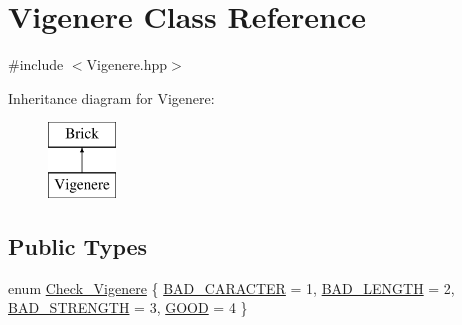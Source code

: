 \hypertarget{class_vigenere}{}\section{Vigenere Class Reference}
\label{class_vigenere}


{\ttfamily \#include $<$Vigenere.\+hpp$>$}

Inheritance diagram for Vigenere\+:\begin{figure}[H]
\begin{center}
\leavevmode
\includegraphics[height=2.000000cm]{d2/dcd/class_vigenere}
\end{center}
\end{figure}
\subsection*{Public Types}
\begin{DoxyCompactItemize}
\item 
enum \hyperlink{class_vigenere_a7c9057eacefc2b70c2f6376808ae24cd}{Check\+\_\+\+Vigenere} \{ \hyperlink{class_vigenere_a7c9057eacefc2b70c2f6376808ae24cda5b266a9ef8e022122a6361ed7b1156d3}{B\+A\+D\+\_\+\+C\+A\+R\+A\+C\+T\+E\+R} = 1, 
\hyperlink{class_vigenere_a7c9057eacefc2b70c2f6376808ae24cdae6a81c51e7f8647713bd2b91e8a64387}{B\+A\+D\+\_\+\+L\+E\+N\+G\+T\+H} = 2, 
\hyperlink{class_vigenere_a7c9057eacefc2b70c2f6376808ae24cda935938c6d3644eff451b497495b99c20}{B\+A\+D\+\_\+\+S\+T\+R\+E\+N\+G\+T\+H} = 3, 
\hyperlink{class_vigenere_a7c9057eacefc2b70c2f6376808ae24cdaaaffac21a07163d0cbaad88a80e98ab7}{G\+O\+O\+D} = 4
 \}
\end{DoxyCompactItemize}
